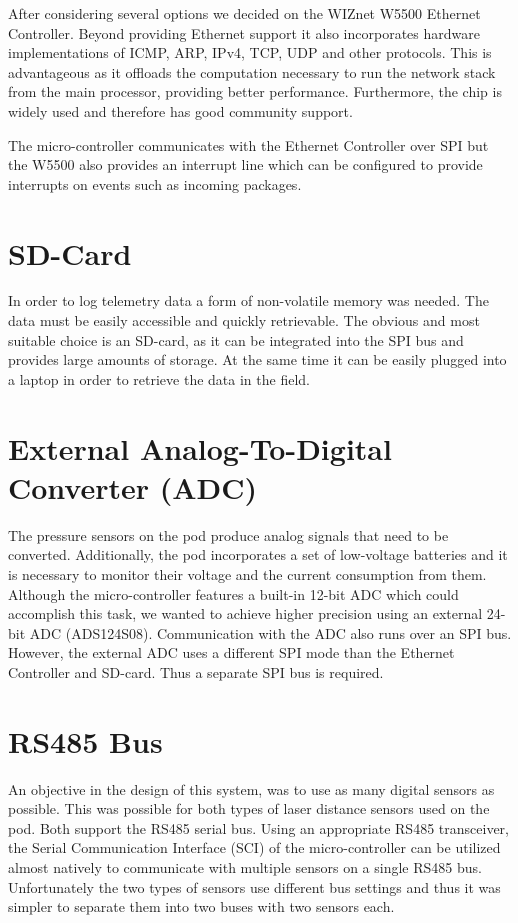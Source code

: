 After considering several options we decided on the WIZnet W5500 Ethernet Controller. Beyond providing Ethernet support it also incorporates hardware implementations of ICMP, ARP, IPv4, TCP, UDP and other protocols. This is advantageous as it offloads the computation necessary to run the network stack from the main processor, providing better performance. Furthermore, the chip is widely used and therefore has good community support.

The micro-controller communicates with the Ethernet Controller over SPI but the W5500 also provides an interrupt line which can be configured to provide interrupts on events such as incoming packages.

\section{SD-Card}

In order to log telemetry data a form of non-volatile memory was needed. The data must be easily accessible and quickly retrievable. The obvious and most suitable choice is an SD-card, as it can be integrated into the SPI bus and provides large amounts of storage. At the same time it can be easily plugged into a laptop in order to retrieve the data in the field.

\section{External Analog-To-Digital Converter (ADC)}

The pressure sensors on the pod produce analog signals that need to be converted. Additionally, the pod incorporates a set of low-voltage batteries and it is necessary to monitor their voltage and the current consumption from them. Although the micro-controller features a built-in 12-bit ADC which could accomplish this task, we wanted to achieve higher precision using an external 24-bit ADC (ADS124S08). Communication with the ADC also runs over an SPI bus. However, the external ADC uses a different SPI mode than the Ethernet Controller and SD-card. Thus a separate SPI bus is required.

\section{RS485 Bus}

An objective in the design of this system, was to use as many digital sensors as possible. This was possible for both types of laser distance sensors used on the pod. Both support the RS485 serial bus. Using an appropriate RS485 transceiver, the Serial Communication Interface (SCI) of the micro-controller can be utilized almost natively to communicate with multiple sensors on a single RS485 bus. Unfortunately the two types of sensors use different bus settings and thus it was simpler to separate them into two buses with two sensors each.

